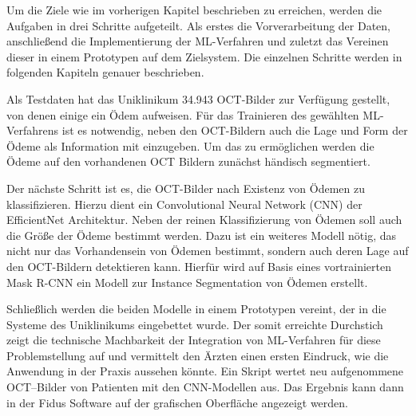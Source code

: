 Um die Ziele wie im vorherigen Kapitel beschrieben zu erreichen, werden die Aufgaben in drei Schritte aufgeteilt. Als erstes die Vorverarbeitung der Daten, anschließend die Implementierung der ML-Verfahren und zuletzt das Vereinen dieser in einem Prototypen auf dem Zielsystem. Die einzelnen Schritte werden in folgenden Kapiteln genauer beschrieben. 

Als Testdaten hat das Uniklinikum 34.943 OCT-Bilder zur Verfügung gestellt, von denen einige ein Ödem aufweisen. 
Für das Trainieren des gewählten ML-Verfahrens ist es notwendig, neben den OCT-Bildern auch die Lage und Form der Ödeme als Information mit einzugeben. 
Um das zu ermöglichen werden die Ödeme auf den vorhandenen OCT Bildern zunächst händisch segmentiert. 

Der nächste Schritt ist es, die OCT-Bilder nach Existenz von Ödemen zu klassifizieren. Hierzu dient ein Convolutional Neural Network (CNN) der EfficientNet Architektur. Neben der reinen Klassifizierung von Ödemen soll auch die Größe der Ödeme bestimmt werden. Dazu ist ein weiteres Modell nötig, das nicht nur das Vorhandensein von Ödemen bestimmt, sondern auch deren Lage auf den OCT-Bildern detektieren kann. Hierfür wird auf Basis eines vortrainierten Mask R-CNN ein Modell zur Instance Segmentation von Ödemen erstellt.

Schließlich werden die beiden Modelle in einem Prototypen vereint, der in die Systeme des Uniklinikums eingebettet wurde. Der somit erreichte Durchstich zeigt die technische Machbarkeit der Integration von ML-Verfahren für diese Problemstellung auf und vermittelt den Ärzten einen ersten Eindruck, wie die Anwendung in der Praxis aussehen könnte. 
Ein Skript wertet neu aufgenommene OCT–Bilder von Patienten mit den CNN-Modellen aus. Das Ergebnis kann dann in der Fidus Software auf der grafischen Oberfläche angezeigt werden. 

